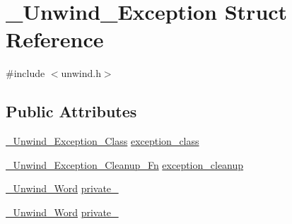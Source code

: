 \hypertarget{struct__Unwind__Exception}{\section{\-\_\-\-Unwind\-\_\-\-Exception Struct Reference}
\label{struct__Unwind__Exception}
}


{\ttfamily \#include $<$unwind.\-h$>$}

\subsection*{Public Attributes}
\begin{DoxyCompactItemize}
\item 
\hyperlink{unwind_8h_a27224c155dddee626baa8193e2443bcc}{\-\_\-\-Unwind\-\_\-\-Exception\-\_\-\-Class} \hyperlink{struct__Unwind__Exception_ade34d40df51766d7ff384a01237209ae}{exception\-\_\-class}
\item 
\hyperlink{unwind_8h_a780c72fc3c6627bedde5dd528e8f2813}{\-\_\-\-Unwind\-\_\-\-Exception\-\_\-\-Cleanup\-\_\-\-Fn} \hyperlink{struct__Unwind__Exception_a44d69c695cdcc6fcde54ae458a69a4c8}{exception\-\_\-cleanup}
\item 
\hyperlink{unwind_8h_ae926c7eabbc191bea2e4acb77adf1138}{\-\_\-\-Unwind\-\_\-\-Word} \hyperlink{struct__Unwind__Exception_a90fbbe59c5adade160b6bb21b5f71d3d}{private\-\_}
\item 
\hyperlink{unwind_8h_ae926c7eabbc191bea2e4acb77adf1138}{\-\_\-\-Unwind\-\_\-\-Word} \hyperlink{struct__Unwind__Exception_a5baef90b9b72c2b612cf44326674ef24}{private\-\_}
\end{DoxyCompactItemize}


